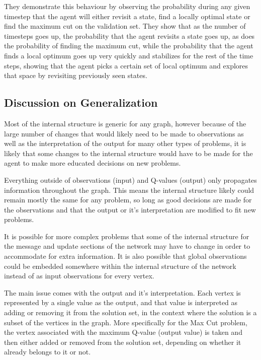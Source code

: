 \documentclass{article}
\begin{document}
They demonstrate this behaviour by observing the probability during any given timestep that the agent will either revisit a state, find a locally optimal state or find the maximum cut on the validation set. They show that as the number of timesteps goes up, the probability that the agent revisits a state goes up, as does the probability of finding the maximum cut, while the probability that the agent finds a local optimum goes up very quickly and stabilizes for the rest of the time steps, showing that the agent picks a certain set of local optimum and explores that space by revisiting previously seen states.

\subsection{Discussion on Generalization}

Most of the internal structure is generic for any graph, however because of the large number of changes that would likely need to be made to observations as well as the interpretation of the output for many other types of problems, it is likely that some changes to the internal structure would have to be made for the agent to make more educated decisions on new problems.

Everything outside of observations (input) and Q-values (output) only propagates information throughout the graph. This means the internal structure likely could remain mostly the same for any problem, so long as good decisions are made for the observations and that the output or it's interpretation are modified to fit new problems.

It is possible for more complex problems that some of the internal structure for the message and update sections of the network may have to change in order to accommodate for extra information. It is also possible that global observations could be embedded somewhere within the internal structure of the network instead of as input observations for every vertex.

The main issue comes with the output and it's interpretation. Each vertex is represented by a single value as the output, and that value is interpreted as adding or removing it from the solution set, in the context where the solution is a subset of the vertices in the graph. More specifically for the Max Cut problem, the vertex associated with the maximum Q-value (output value) is taken and then either added or removed from the solution set, depending on whether it already belongs to it or not. 
\end{document}
